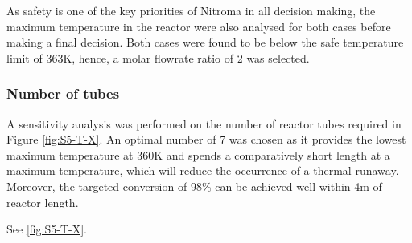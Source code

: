 As safety is one of the key priorities of Nitroma in all decision making, the maximum temperature in the reactor were also analysed for both cases before making a final decision. Both cases were found to be below the safe temperature limit of 363K, hence, a molar flowrate ratio of 2 was selected.

\subsubsection{Number of tubes}
A sensitivity analysis was performed on the number of reactor tubes required in Figure \ref{fig:S5-T-X}. An optimal number of 7 was chosen as it provides the lowest maximum temperature at 360K and spends a comparatively short length at a maximum temperature, which will reduce the occurrence of a thermal runaway. Moreover, the targeted conversion of 98\% can be achieved well within 4m of reactor length. 

See \cref{fig:S5-T-X}.

